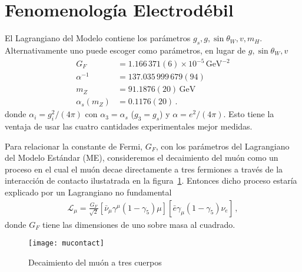 \section{Fenomenología Electrodébil}
\label{sec:fenom-electr}
\begin{frame}
El Lagrangiano del Modelo contiene los parámetros $g_s,g,\sin\theta_W,v,m_H$. Alternativamente uno puede escoger como parámetros, en lugar de $g,\sin\theta_W,v$ \cite{a}
\begin{align}
  \label{eq:233qft}
  G_F&=1.166\,371(6)\times 10^{-5}\,\text{GeV}^{-2}\nonumber\\
  \alpha^{-1}&=137.035\,999\,679(94)\nonumber\\
  m_Z&=91.1876(20)\,\text{GeV}\nonumber\\
  \alpha_s(m_Z)&=0.1176(20)\,.
\end{align}
donde $\alpha_i=g_i^2/(4\pi)$ con $\alpha_3=\alpha_s$ ($g_3=g_s$) y $\alpha=e^2/(4\pi)$. Esto tiene la ventaja de usar las cuatro cantidades experimentales mejor medidas.


Para relacionar la constante de Fermi, $G_F$, con los parámetros del Lagrangiano del Modelo Estándar (ME), consideremos el decaimiento del muón como un proceso en el cual el muón decae directamente a tres fermiones a través de la  interacción de contacto ilustatrada en la figura~\ref{fig:mucontact}. Entonces dicho proceso estaría explicado por un Lagrangiano no fundamental
\begin{align}
  \mathcal{L}_{\mu}=\frac{G_F}{\sqrt{2}}\left[\bar{\nu}_\mu\gamma^\mu(1-\gamma_5)\mu\right]\left[\bar{e}\gamma_\mu(1-\gamma_5)\nu_e\right]\,,
\end{align}
donde $G_F$ tiene las dimensiones de uno sobre masa al cuadrado. 

\begin{figure}
  \centering
\texttt{[image: mucontact]}  
  \caption{Decaimiento del muón a tres cuerpos}
  \label{fig:mucontact}
\end{figure}


\end{frame}
